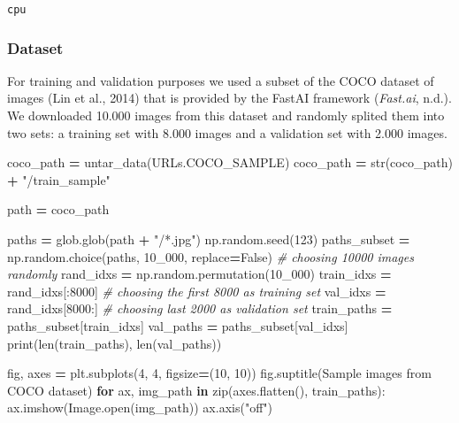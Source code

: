\documentclass[
]{article}
\newenvironment{Shaded}{\begin{snugshade}}{\end{snugshade}}
\newcommand{\BuiltInTok}[1]{#1}
\newcommand{\CommentTok}[1]{\textcolor[rgb]{0.56,0.35,0.01}{\textit{#1}}}
\newcommand{\ControlFlowTok}[1]{\textcolor[rgb]{0.13,0.29,0.53}{\textbf{#1}}}
\newcommand{\DecValTok}[1]{\textcolor[rgb]{0.00,0.00,0.81}{#1}}
\newcommand{\KeywordTok}[1]{\textcolor[rgb]{0.13,0.29,0.53}{\textbf{#1}}}
\newcommand{\NormalTok}[1]{#1}
\newcommand{\OperatorTok}[1]{\textcolor[rgb]{0.81,0.36,0.00}{\textbf{#1}}}
\newcommand{\StringTok}[1]{\textcolor[rgb]{0.31,0.60,0.02}{#1}}
\newcommand{\VariableTok}[1]{\textcolor[rgb]{0.00,0.00,0.00}{#1}}
\begin{document}
\begin{verbatim}
cpu
\end{verbatim}

\hypertarget{dataset}{%
\subsubsection{Dataset}\label{dataset}}

For training and validation purposes we used a subset of the COCO
dataset of images (Lin et al., 2014) that is provided by the FastAI
framework (\emph{Fast.ai}, n.d.). We downloaded 10.000 images from this
dataset and randomly splited them into two sets: a training set with
8.000 images and a validation set with 2.000 images.

\begin{Shaded}
\begin{Highlighting}[]
\NormalTok{ coco\_path }\OperatorTok{=}\NormalTok{ untar\_data(URLs.COCO\_SAMPLE)}
\NormalTok{ coco\_path }\OperatorTok{=} \BuiltInTok{str}\NormalTok{(coco\_path) }\OperatorTok{+} \StringTok{"/train\_sample"}
\end{Highlighting}
\end{Shaded}

\begin{Shaded}
\begin{Highlighting}[]
\NormalTok{path }\OperatorTok{=}\NormalTok{ coco\_path}
    
\NormalTok{paths }\OperatorTok{=}\NormalTok{ glob.glob(path }\OperatorTok{+} \StringTok{"/*.jpg"}\NormalTok{) }
\NormalTok{np.random.seed(}\DecValTok{123}\NormalTok{)}
\NormalTok{paths\_subset }\OperatorTok{=}\NormalTok{ np.random.choice(paths, }\DecValTok{10\_000}\NormalTok{, replace}\OperatorTok{=}\VariableTok{False}\NormalTok{) }\CommentTok{\# choosing 10000 images randomly}
\NormalTok{rand\_idxs }\OperatorTok{=}\NormalTok{ np.random.permutation(}\DecValTok{10\_000}\NormalTok{)}
\NormalTok{train\_idxs }\OperatorTok{=}\NormalTok{ rand\_idxs[:}\DecValTok{8000}\NormalTok{] }\CommentTok{\# choosing the first 8000 as training set}
\NormalTok{val\_idxs }\OperatorTok{=}\NormalTok{ rand\_idxs[}\DecValTok{8000}\NormalTok{:] }\CommentTok{\# choosing last 2000 as validation set}
\NormalTok{train\_paths }\OperatorTok{=}\NormalTok{ paths\_subset[train\_idxs]}
\NormalTok{val\_paths }\OperatorTok{=}\NormalTok{ paths\_subset[val\_idxs]}
\BuiltInTok{print}\NormalTok{(}\BuiltInTok{len}\NormalTok{(train\_paths), }\BuiltInTok{len}\NormalTok{(val\_paths))}

\NormalTok{fig, axes }\OperatorTok{=}\NormalTok{ plt.subplots(}\DecValTok{4}\NormalTok{, }\DecValTok{4}\NormalTok{, figsize}\OperatorTok{=}\NormalTok{(}\DecValTok{10}\NormalTok{, }\DecValTok{10}\NormalTok{))}
\NormalTok{fig.suptitle(}\StringTok{\textquotesingle{}Sample images from COCO dataset\textquotesingle{}}\NormalTok{)}
\ControlFlowTok{for}\NormalTok{ ax, img\_path }\KeywordTok{in} \BuiltInTok{zip}\NormalTok{(axes.flatten(), train\_paths):}
\NormalTok{    ax.imshow(Image.}\BuiltInTok{open}\NormalTok{(img\_path))}
\NormalTok{    ax.axis(}\StringTok{"off"}\NormalTok{)}
\end{Highlighting}
\end{Shaded}
\end{document}
